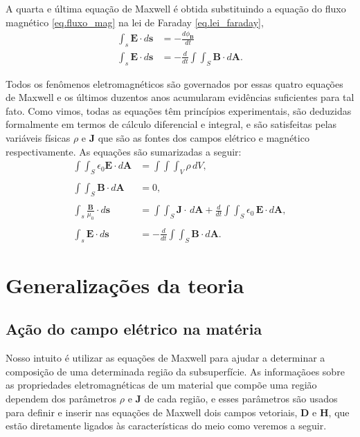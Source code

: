 A quarta e última equação de Maxwell é obtida substituindo a equação do fluxo magnético \ref{eq.fluxo_mag} na lei de Faraday \ref{eq.lei_faraday},
\begin{align*}
\int_s\pmb{E}\cdot d\pmb{s}&=-\frac{d\phi_\mathbf{B}}{dt}\\
\int_s\pmb{E}\cdot d\pmb{s}&=-\frac{d}{dt}\int\int_S\pmb{B}\cdot d\pmb{A}.
\end{align*}

Todos os fenômenos eletromagnéticos são governados por essas quatro equações de Maxwell  e os últimos duzentos anos acumularam evidências suficientes para tal fato. Como vimos, todas as equações têm princípios experimentais, são deduzidas formalmente em termos de cálculo diferencial e integral, e são satisfeitas pelas variáveis físicas $\rho$ e $\mathbf{J}$ que são as fontes dos campos elétrico e magnético respectivamente. As equações são sumarizadas a seguir:
\begin{align}\label{eq.maxwell_1}
\int\int_S\epsilon_0\textbf{E}\cdot\textit{d}\textbf{A}&=\int\int\int_{V}\rho\,dV,\\\nonumber\\\label{eq.maxwell_2}
\int\int_S\textbf{B}\cdot\textit{d}\textbf{A}&=0,\\\nonumber\\\label{eq.maxwell_3}
\int_s\frac{\mathbf{B}}{\mu_0}\cdot d\mathbf{s}&=\int\int_S\mathbf{J}\cdot\,d\mathbf{A}+\frac{d}{dt}\int\int_S\epsilon_0\,\textbf{E}\cdot\textit{d}\textbf{A},\\\nonumber\\\label{eq.maxwell_4}
\int_s\pmb{E}\cdot d\pmb{s}&=-\frac{d}{dt}\int\int_S\pmb{B}\cdot d\pmb{A}.
\end{align}

\section{Generalizações da teoria}

\subsection{Ação do campo elétrico na matéria}

Nosso intuito é utilizar as equações de Maxwell para ajudar a determinar a composição de uma determinada região da subsuperfície. As informaçãoes sobre as propriedades eletromagnéticas de um material que compõe uma região dependem dos parâmetros $\rho$ e $\mathbf{J}$ de cada região, e esses parâmetros são usados para definir e inserir nas equações de Maxwell dois campos vetoriais, $\mathbf{D}$ e $\mathbf{H}$, que estão diretamente ligados às características do meio como veremos a seguir.

